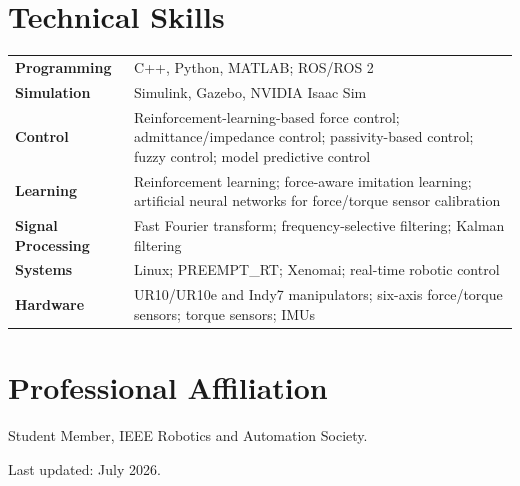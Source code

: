 \documentclass[10pt,letterpaper]{article}
\begin{document}
\section{Technical Skills}
\begin{tabularx}{\textwidth}{@{}>{\bfseries}l X@{}}
Programming & C++, Python, MATLAB; ROS/ROS 2\\
Simulation & Simulink, Gazebo, NVIDIA Isaac Sim\\
Control & Reinforcement-learning-based force control; admittance/impedance control; passivity-based control; fuzzy control; model predictive control\\
Learning & Reinforcement learning; force-aware imitation learning; artificial neural networks for force/torque sensor calibration\\
Signal Processing & Fast Fourier transform; frequency-selective filtering; Kalman filtering\\
Systems & Linux; PREEMPT\_RT; Xenomai; real-time robotic control\\
Hardware & UR10/UR10e and Indy7 manipulators; six-axis force/torque sensors; torque sensors; IMUs
\end{tabularx}

\section{Professional Affiliation}
Student Member, IEEE Robotics and Automation Society.

\vfill
{\footnotesize\color{muted}Last updated: July 2026.}
\end{document}
